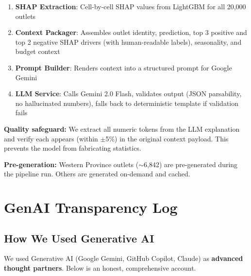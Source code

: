 \documentclass[10.75pt, a4paper]{article}
\begin{document}
\begin{enumerate}
    \item \textbf{SHAP Extraction}: Cell-by-cell SHAP values from LightGBM for all 20,000 outlets
    \item \textbf{Context Packager}: Assembles outlet identity, prediction, top 3 positive and top 2 negative SHAP drivers (with human-readable labels), seasonality, and budget context
    \item \textbf{Prompt Builder}: Renders context into a structured prompt for Google Gemini
    \item \textbf{LLM Service}: Calls Gemini 2.0 Flash, validates output (JSON parsability, no hallucinated numbers), falls back to deterministic template if validation fails
\end{enumerate}

\textbf{Quality safeguard:} We extract all numeric tokens from the LLM explanation and verify each appears (within $\pm$5\%) in the original context payload. This prevents the model from fabricating statistics.

\textbf{Pre-generation:} Western Province outlets ($\sim$6,842) are pre-generated during the pipeline run. Others are generated on-demand and cached.
\vspace{5cm} %
\section{GenAI Transparency Log}

\subsection{How We Used Generative AI}

We used Generative AI (Google Gemini, GitHub Copilot, Claude) as \textbf{advanced thought partners}. Below is an honest, comprehensive account.
\end{document}
